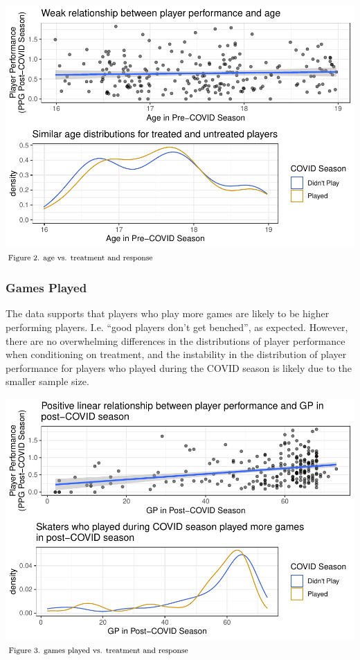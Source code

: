 \documentclass[12pt]{article}
\begin{document}
\includegraphics{journal-article_files/figure-latex/age-plots-1.pdf}
\(\hspace*{\fill} \footnotesize \text{Figure 2. age vs. treatment and response}\)

\hypertarget{games-played}{%
\subsubsection{Games Played}\label{games-played}}

The data supports that players who play more games are likely to be
higher performing players. I.e. ``good players don't get benched'', as
expected. However, there are no overwhelming differences in the
distributions of player performance when conditioning on treatment, and
the instability in the distribution of player performance for players
who played during the COVID season is likely due to the smaller sample
size.

\includegraphics{journal-article_files/figure-latex/gp-plots-1.pdf}
\(\hspace*{\fill} \footnotesize \text{Figure 3. games played vs. treatment and response}\)
\end{document}

